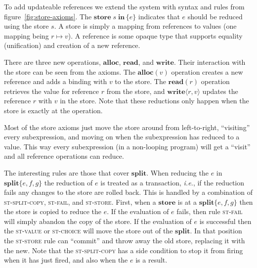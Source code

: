 \documentclass[acmsmall,review,dvipsnames]{acmart}
\newcommand{\Varid}[1]{\mathit{#1}}
\newcommand{\ie}{\emph{i.e.}}	%
\newcommand{\rulename}[1]{\textsc{\small #1}}
\begin{document}
To add updateable references we extend the system with syntax and rules from figure~\ref{fig:store-axioms}.
The \ensuremath{\textbf{store}\;\Varid{s}\;\textbf{in}\,\{\Varid{e}\}} indicates that \ensuremath{\Varid{e}} should be reduced using the store \ensuremath{\Varid{s}}.
A store is simply a mapping from references to values (one mapping being \ensuremath{\Varid{r}\mapsto\!\Varid{v}}).
A reference is some opaque type that supports equality (unification) and creation of a new reference.

There are three new operations, \ensuremath{\textbf{alloc}}, \ensuremath{\textbf{read}}, and \ensuremath{\textbf{write}}.
Their interaction with the store can be seen from the axioms.
The \ensuremath{\textbf{alloc}(\Varid{v})} operation creates a new reference and adds a binding with \ensuremath{\Varid{v}} to the store.
The \ensuremath{\textbf{read}(\Varid{r})} operation retrieves the value for reference \ensuremath{\Varid{r}} from the store,
and \ensuremath{\textbf{write}\langle\Varid{r},\Varid{v}\rangle} updates the reference \ensuremath{\Varid{r}} with \ensuremath{\Varid{v}} in the store.
Note that these reductions only happen when the store is exactly at the operation.

Most of the store axioms just move the store around from left-to-right, ``visiting'' every subexpression,
and moving on when the subexpression has reduced to a value.
This way every subexpression (in a non-looping program) will get a ``visit'' and all reference operations
can reduce.

The interesting rules are those that cover \ensuremath{\textbf{split}}.
When reducing the \ensuremath{\Varid{e}} in \ensuremath{\textbf{split}\{\Varid{e},\Varid{f},\Varid{g}\}} the reduction of \ensuremath{\Varid{e}} is treated as a transaction, {\ie},
if the reduction fails any changes to the store are rolled back.
This is handled by a combination of \rulename{st-split-copy}, \rulename{st-fail}, and \rulename{st-store}.
First, when a \ensuremath{\textbf{store}} is at a \ensuremath{\textbf{split}\{\Varid{e},\Varid{f},\Varid{g}\}} then the store is copied to reduce the \ensuremath{\Varid{e}}.
If the evaluation of \ensuremath{\Varid{e}} fails, then rule \rulename{st-fail} will simply abandon the copy of the store.
If the evaluation of \ensuremath{\Varid{e}} is successful then the \rulename{st-value} or \rulename{st-choice} will move the store out of the \ensuremath{\textbf{split}}.
In that position the \rulename{st-store} rule can ``commit'' and throw away the old store, replacing it with the new.
Note that the \rulename{st-split-copy} has a side condition to stop it from firing when it has just fired,
and also when the \ensuremath{\Varid{e}} is a result.
\end{document}
